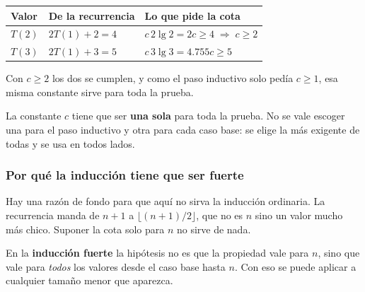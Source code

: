 \documentclass[11pt,letterpaper]{article}
\begin{document}
\begin{center}
\begin{tabular}{lll}
  \toprule
  \textbf{Valor} & \textbf{De la recurrencia} & \textbf{Lo que pide
    la cota} \\
  \midrule
  $T(2)$ & $2T(1) + 2 = 4$ & $c\,2 \lg 2 = 2c \geq 4
                             \;\Rightarrow\; c \geq 2$ \\
  $T(3)$ & $2T(1) + 3 = 5$ & $c\,3 \lg 3 = 4.755c \geq 5$ \\
  \bottomrule
\end{tabular}
\end{center}

Con $c \geq 2$ los dos se cumplen, y como el paso inductivo solo pedía
$c \geq 1$, esa misma constante sirve para toda la prueba.

\begin{ojo}
  La constante $c$ tiene que ser \textbf{una sola} para toda la
  prueba. No se vale escoger una para el paso inductivo y otra para
  cada caso base: se elige la más exigente de todas y se usa en todos
  lados.
\end{ojo}

\subsubsection*{Por qué la inducción tiene que ser fuerte}

Hay una razón de fondo para que aquí no sirva la inducción ordinaria.
La recurrencia manda de $n+1$ a $\lfloor (n+1)/2 \rfloor$, que no es
$n$ sino un valor mucho más chico. Suponer la cota solo para $n$ no
sirve de nada.

\begin{definicion}
  En la \textbf{inducción fuerte} la hipótesis no es que la propiedad
  vale para $n$, sino que vale para \emph{todos} los valores desde el
  caso base hasta $n$. Con eso se puede aplicar a cualquier tamaño
  menor que aparezca.
\end{definicion}
\end{document}
